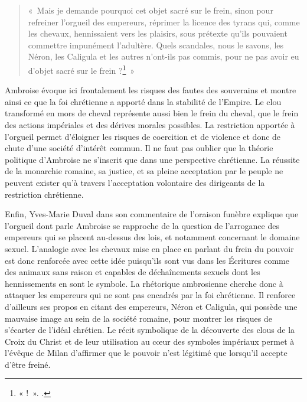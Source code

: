 \begin{quote}
    «~Mais je demande pourquoi cet objet sacré sur le frein, sinon pour refreiner l'orgueil des empereurs, réprimer la licence des tyrans qui, comme les chevaux, hennissaient vers les plaisirs, sous prétexte qu’ils pouvaient commettre impunément l’adultère. Quels scandales, nous le savons, les Néron, les Caligula et les autres n’ont-ils pas commis, pour ne pas avoir eu d’objet sacré sur le frein ?\footnote{« !~». \cite[]{ambroise_mort_theodose}.}~»
\end{quote}

\bigskip

Ambroise évoque ici frontalement les risques des fautes des souverains et montre ainsi ce que la foi chrétienne a apporté dans la stabilité de l'Empire. Le clou transformé en mors de cheval représente aussi bien le frein du cheval, que le frein des actions impériales et des dérives morales possibles. La restriction apportée à l'orgueil permet d'éloigner les risques de coercition et de violence et donc de chute d'une société d'intérêt commun. Il ne faut pas oublier que la théorie politique d'Ambroise ne s'inscrit que dans une perspective chrétienne. La réussite de la monarchie romaine, sa justice, et sa pleine acceptation par le peuple ne peuvent exister qu'à travers l'acceptation volontaire des dirigeants de la restriction chrétienne.

\bigskip

Enfin, Yves-Marie Duval dans son commentaire de l'oraison funèbre explique que l'orgueil dont parle Ambroise se rapproche de la question de l'arrogance des empereurs qui se placent au-dessus des lois, et notamment concernant le domaine sexuel. L'analogie avec les chevaux mise en place en parlant du frein du pouvoir est donc renforcée avec cette idée puisqu'ils sont vus dans les Écritures comme des animaux sans raison et capables de déchaînements sexuels dont les hennissements en sont le symbole\autocite[Note 1 page 234]{ambroise_mort_theodose}. La rhétorique ambrosienne cherche donc à attaquer les empereurs qui ne sont pas encadrés par la foi chrétienne. Il renforce d'ailleurs ses propos en citant des empereurs, Néron et Caligula, qui possède une mauvaise image au sein de la société romaine, pour montrer les risques de s'écarter de l'idéal chrétien. Le récit symbolique de la découverte des clous de la Croix du Christ et de leur utilisation au cœur des symboles impériaux permet à l'évêque de Milan d'affirmer que le pouvoir n'est légitimé que lorsqu'il accepte d'être freiné.

